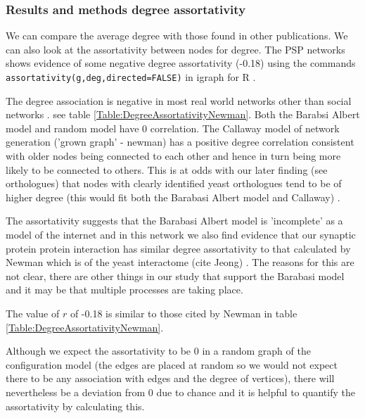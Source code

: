\subsubsection{Results and methods degree assortativity}
We can compare the average degree with those found in other publications. We can also look at the assortativity between nodes for degree. The PSP networks shows evidence of some negative degree assortativity (-0.18) using the commands \texttt{assortativity(g,deg,directed=FALSE)} in igraph for R .

The degree association is negative in most real world networks other than social networks \cite{newman2002assortative}.  see table \ref{Table:DegreeAssortativityNewman}. Both the Barabsi Albert model and random model have 0 correlation. The Callaway model of network generation ('grown graph' - newman) has a positive degree correlation consistent with older nodes being connected to each other and hence in turn being more likely to be connected to others. This is at odds with our later finding (see orthologues) that nodes with clearly identified yeast orthologues tend to be of higher degree (this would fit both the Barabasi Albert model and Callaway) . 

The assortativity suggests that the Barabasi Albert model is 'incomplete' as a model of the internet \cite{newman2002assortative} and in this network we also find evidence that our synaptic protein protein interaction has similar degree assortativity to that calculated by Newman which is of the yeast interactome (cite Jeong) . The reasons for this are not clear, there are other things in our study that support the Barabasi model and it may be that multiple processes are taking place. 

The value of $r$ of -0.18  is similar to those cited by Newman \cite{newman2002assortative} in table \ref{Table:DegreeAssortativityNewman}. 

Although we expect the assortativity to be 0 in a random graph of the configuration model (the edges are placed at random so we would not expect there to be any association with edges and the degree of vertices), there will nevertheless be a deviation from 0 due to chance and it is helpful to quantify the assortativity by calculating this. 

